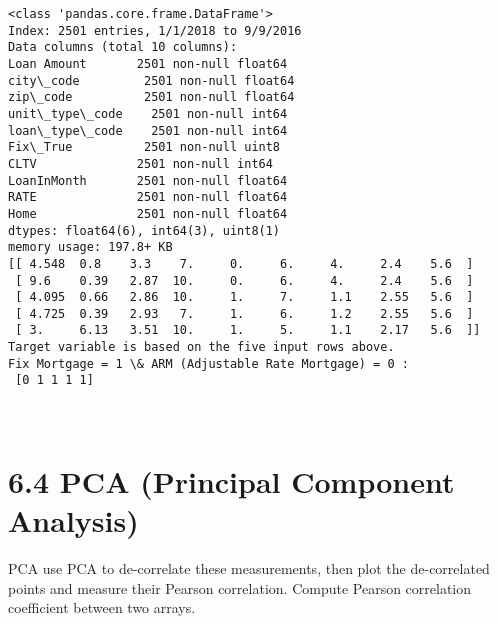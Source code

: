 \documentclass[11pt]{article}
\begin{document}
    \begin{Verbatim}[commandchars=\\\{\}]
<class 'pandas.core.frame.DataFrame'>
Index: 2501 entries, 1/1/2018 to 9/9/2016
Data columns (total 10 columns):
Loan Amount       2501 non-null float64
city\_code         2501 non-null float64
zip\_code          2501 non-null float64
unit\_type\_code    2501 non-null int64
loan\_type\_code    2501 non-null int64
Fix\_True          2501 non-null uint8
CLTV              2501 non-null int64
LoanInMonth       2501 non-null float64
RATE              2501 non-null float64
Home              2501 non-null float64
dtypes: float64(6), int64(3), uint8(1)
memory usage: 197.8+ KB
[[ 4.548  0.8    3.3    7.     0.     6.     4.     2.4    5.6  ]
 [ 9.6    0.39   2.87  10.     0.     6.     4.     2.4    5.6  ]
 [ 4.095  0.66   2.86  10.     1.     7.     1.1    2.55   5.6  ]
 [ 4.725  0.39   2.93   7.     1.     6.     1.2    2.55   5.6  ]
 [ 3.     6.13   3.51  10.     1.     5.     1.1    2.17   5.6  ]]
Target variable is based on the five input rows above. 
Fix Mortgage = 1 \& ARM (Adjustable Rate Mortgage) = 0 : 
 [0 1 1 1 1]

    \end{Verbatim}

    \begin{center}
    \end{center}
    { \hspace*{\fill} \\}
    
    \section{6.4 PCA (Principal Component
Analysis)}\label{pca-principal-component-analysis}

PCA use PCA to de-correlate these measurements, then plot the
de-correlated points and measure their Pearson correlation. Compute
Pearson correlation coefficient between two arrays.
\end{document}
